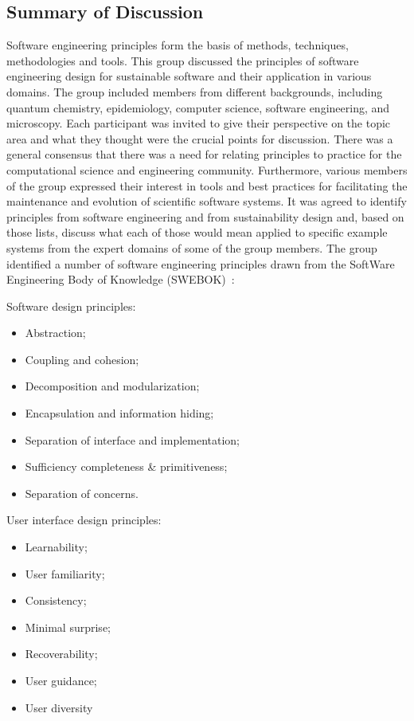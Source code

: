 \subsection{Summary of Discussion}
Software engineering principles form the basis of methods, techniques, methodologies and tools. This group discussed the principles of software engineering design for sustainable software and their application in various domains. The group included members from different backgrounds, including quantum chemistry, epidemiology, computer science, software engineering, and microscopy. Each participant was invited to give their perspective on the topic area and what they thought were the crucial points for discussion. There was a general consensus that there was a need for relating principles to practice for the computational science and engineering community. Furthermore, various members of the group expressed their interest in tools and best practices for facilitating the maintenance and evolution of scientific software systems. It was agreed to identify principles from software engineering and from sustainability design and, based on those lists, discuss what each of those would mean applied to specific example systems from the expert domains of some of the group members. The group identified a number of software engineering principles drawn from the SoftWare Engineering Body of Knowledge (SWEBOK)~\cite{swebokv3}:

Software design principles:
\begin{itemize}
\item Abstraction;
\item Coupling and cohesion;
\item Decomposition and modularization;
\item Encapsulation and information hiding;
\item Separation of interface and implementation;
\item Sufficiency completeness \& primitiveness;
\item Separation of concerns.
\end{itemize}

User interface design principles:
\begin{itemize}
\item Learnability;
\item User familiarity;
\item Consistency;
\item Minimal surprise;
\item Recoverability;
\item User guidance;
\item User diversity
\end{itemize}


